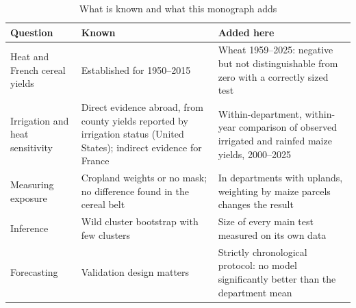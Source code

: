 \begin{table}[H]
\centering
\small
\caption{What is known and what this monograph adds}
\label{tab:positioning}
\begin{tabular}{>{\raggedright}p{3.3cm}>{\raggedright}p{5.4cm}>{\raggedright\arraybackslash}p{5.4cm}}
\toprule
Question & Known & Added here \\
\midrule
Heat and French cereal yields & Established for 1950--2015 \parencite{gammans2017} & Wheat 1959--2025: negative but not distinguishable from zero with a correctly sized test \\
Irrigation and heat sensitivity & Direct evidence abroad, from county yields reported by irrigation status (United States); indirect evidence for France & Within-department, within-year comparison of observed irrigated and rainfed maize yields, 2000--2025 \\
Measuring exposure & Cropland weights or no mask; no difference found in the cereal belt \parencite{benari2018} & In departments with uplands, weighting by maize parcels changes the result \\
Inference & Wild cluster bootstrap with few clusters & Size of every main test measured on its own data \\
Forecasting & Validation design matters & Strictly chronological protocol: no model significantly better than the department mean \\
\bottomrule
\end{tabular}
\end{table}

